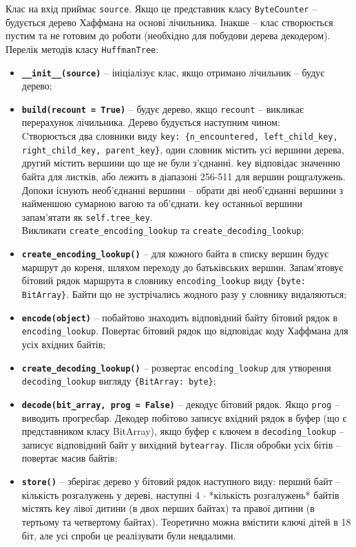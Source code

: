 \documentclass{article}
\def\code#1{\texttt{#1}}
\begin{document}
Клас на вхід приймає \code{source}. Якщо це представник класу \code{ByteCounter} -- будується дерево Хаффмана на основі лічильника. Інакше -- клас створюється пустим та не готовим до роботи (необхідно для побудови дерева декодером).\\\indent
Перелік методів класу \code{HuffmanTree}:
\begin{itemize}
    \item \textbf{\code{\_\_init\_\_(source)}} -- ініціалізує клас, якщо отримано лічильник -- будує дерево;
    \item \textbf{\code{build(recount = True)}} -- будує дерево, якщо \code{recount} -- викликає перерахунок лічильника. Дерево будується наступним чином:\\\indent
        Cтворюється два словники виду \code{key: \{n\_encountered, left\_child\_key, right\_child\_key, parent\_key\}}, один словник містить усі вершини дерева, другий містить вершини що ще не були з'єднанні. \code{key} відповідає значенню байта для листків, або лежить в діапазоні 256-511 для вершин рощгалужень.\\\indent
        Допоки існують необ'єднанні вершини -- обрати дві необ'єднанні вершини з найменшою сумарною вагою та об'єднати. \code{key} останньої вершини запам'ятати як \code{self.tree\_key}.\\\indent
        Викликати \code{create\_encoding\_lookup} та \code{create\_decoding\_lookup};
    \item \textbf{\code{create\_encoding\_lookup()}} -- для кожного байта в списку вершин будує маршрут до кореня, шляхом переходу до батьківських вершин. Запам'ятовує бітовий рядок маршрута в словнику \code{encoding\_lookup} виду \code{\{byte: BitArray\}}. Байти що не зустрічались жодного разу у словнику видаляються;
    \item \textbf{\code{encode(object)}} -- побайтово знаходить відповідний байту бітовий рядок в \code{encoding\_lookup}. Повертає бітовий рядок що відповідає коду Хаффмана для усіх вхідних байтів;
    \item \textbf{\code{create\_decoding\_lookup()}} -- розвертає \code{encoding\_lookup} для утворення \code{decoding\_lookup} вигляду \code{\{BitArray: byte\}};
    \item \textbf{\code{decode(bit\_array, prog = False)}} -- декодує бітовий рядок. Якщо \code{prog} -- виводить прогресбар. Декодер побітово записує вхідний рядок в буфер (що є представником класу BitArray), якщо буфер є ключем в \code{decoding\_lookup} -- записує відповідний байт у вихідний \code{bytearray}. Після обробки усіх бітів -- повертає масив байтів;
    \item \textbf{\code{store()}} -- зберігає дерево у бітовий рядок наступного виду: перший байт -- кількість розгалужень у дереві, наступні 4 $\cdot$ *кількість розгалужень* байтів містять \code{key} лівої дитини (в двох перших байтах) та правої дитини (в тертьому та четвертому байтах). Теоретично можна вмістити ключі дітей в 18 біт, але усі спроби це реалізувати були невдалими.
\end{itemize}
\end{document}
